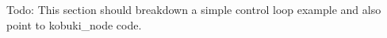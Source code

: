 \-Todo\-: \-This section should breakdown a simple control loop example and also point to kobuki\-\_\-node code. 